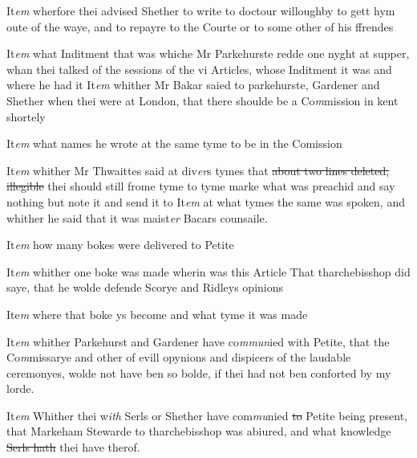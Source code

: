 \documentclass[12pt, a4paper]{book}
\begin{document}
		\ifthenelse{\isodd{\thepage}}
		{\reversemarginpar}
		{\normalmarginpar}
		It\textit{em} wherfore thei advised Shether to write to doctour willoughby to gett hym oute of the waye, and to repayre to the Courte or to some other of his ffrendes
 	
		\ifthenelse{\isodd{\thepage}}
		{\reversemarginpar}
		{\normalmarginpar}
		It\textit{em} what Inditment that was whiche Mr Parkehurste redde one nyght at supper, whan thei talked of the sessions of the vi Articles, whose Inditment it was and where he had it It\textit{em}
 		whither 
			Mr Bakar saied to parkehurste, Gardener and Shether when thei were at London, that there shoulde be a Co\textit{m}mission in kent shortely
 	
		\ifthenelse{\isodd{\thepage}}
		{\reversemarginpar}
		{\normalmarginpar}
		It\textit{em} what names he wrote at the same tyme to be in the Comission
 	
		\ifthenelse{\isodd{\thepage}}
		{\reversemarginpar}
		{\normalmarginpar}
		It\textit{em} whither Mr Thwaittes said at div\textit{er}s tymes that
			\sout{about two lines deleted, illegible}
               thei should still frome tyme to tyme marke what was preachid and say nothing but note it and send it to  It\textit{em} at what tymes the same was spoken, and whither he said that it was maist\textit{er} Bacars counsaile.
 	
		\ifthenelse{\isodd{\thepage}}
		{\reversemarginpar}
		{\normalmarginpar}
		It\textit{em} how many bokes were delivered to Petite
 	
		\ifthenelse{\isodd{\thepage}}
		{\reversemarginpar}
		{\normalmarginpar}
		It\textit{em} whither one boke was made wherin was this Article That tharchebisshop did saye, that he wolde defende Scorye and  Ridleys opinions
 	
		\ifthenelse{\isodd{\thepage}}
		{\reversemarginpar}
		{\normalmarginpar}
		Ite\textit{m} where that boke ys become and what tyme it was made
 	
		\ifthenelse{\isodd{\thepage}}
		{\reversemarginpar}
		{\normalmarginpar}
		It\textit{em} whither Parkehurst and Gardener have co\textit{mmun}ied with Petite, that the Co\textit{m}missarye and other of evill opynions and dispicers of the laudable ceremonyes, wolde not have ben so bolde, if thei had not ben conforted by my lorde.
 		
 			
		\ifthenelse{\isodd{\thepage}}
		{\reversemarginpar}
		{\normalmarginpar}
		It\textit{em} Whither thei w\textit{ith} Serls or Shether have com\textit{mu}nied \sout{to }Petite being present, that Markeham Stewarde to tharchebisshop was abiured, and what knowledge \sout{Serls hath}
               thei have
			 therof.
 	
\end{document}
